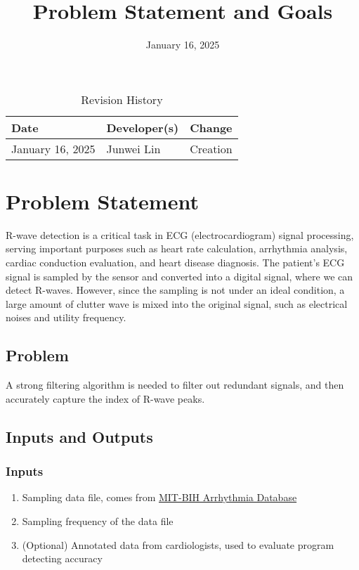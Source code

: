 \documentclass{article}
\title{Problem Statement and Goals\\\progname}
\author{\authname}
\date{January 16, 2025}
\begin{document}
\maketitle

\begin{table}[hp]
\caption{Revision History} \label{TblRevisionHistory}
\begin{tabularx}{\textwidth}{llX}
\toprule
\textbf{Date} & \textbf{Developer(s)} & \textbf{Change}\\
\midrule
January 16, 2025 & Junwei Lin & Creation\\
\bottomrule
\end{tabularx}
\end{table}

\section{Problem Statement}

R-wave detection is a critical task in ECG (electrocardiogram) signal processing, serving important purposes such as heart rate calculation, arrhythmia analysis, cardiac conduction evaluation, and heart disease diagnosis. The patient's ECG signal is sampled by the sensor and converted into a digital signal, where we can detect R-waves. However, since the sampling is not under an ideal condition, a large amount of clutter wave is mixed into the original signal, such as electrical noises and utility frequency.

\subsection{Problem}

A strong filtering algorithm is needed to filter out redundant signals, and then accurately capture the index of R-wave peaks.

\subsection{Inputs and Outputs}

\subsubsection{Inputs}

\begin{enumerate}
    \item Sampling data file, comes from \href{https://physionet.org/content/mitdb/1.0.0/} {MIT-BIH Arrhythmia Database}
    \item Sampling frequency of the data file
    \item (Optional) Annotated data from cardiologists, used to evaluate program detecting accuracy
\end{enumerate}
\end{document}

